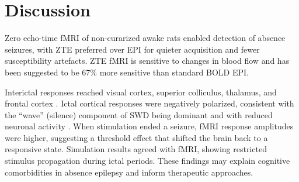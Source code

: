 \documentclass[11pt]{article}
\begin{document}
\section{Discussion}
Zero echo-time fMRI of non-curarized awake rats enabled detection of absence seizures, with ZTE preferred over EPI for quieter acquisition and fewer susceptibility artefacts. ZTE fMRI is sensitive to changes in blood flow \citep{luh2000,restom2007} and has been suggested to be 67\% more sensitive than standard BOLD EPI.

Interictal responses reached visual cortex, superior colliculus, thalamus, and frontal cortex \citep{sefton2015,williams1999,muir1996}. Ictal cortical responses were negatively polarized, consistent with the ``wave'' (silence) component of SWD being dominant and with reduced neuronal activity \citep{fisher1977,gloor1978,inoue1993,kostopoulos1982,mccafferty2023}. When stimulation ended a seizure, fMRI response amplitudes were higher, suggesting a threshold effect that shifted the brain back to a responsive state. Simulation results agreed with fMRI, showing restricted stimulus propagation during ictal periods. These findings may explain cognitive comorbidities in absence epilepsy and inform therapeutic approaches.



\end{document}
